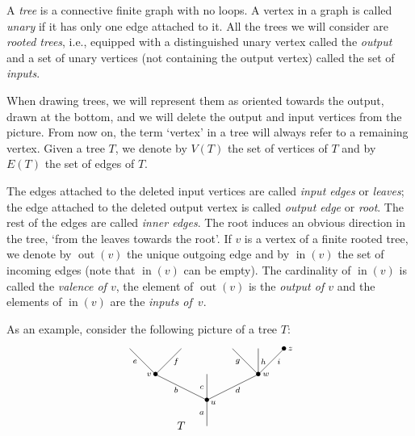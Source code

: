 \documentclass[a4paper]{amsart}
\theoremstyle{plain}
\theoremstyle{definition}
\theoremstyle{remark}
\DeclareMathOperator{\out}{out} \DeclareMathOperator{\inn}{in}
\numberwithin{equation}{section}
\numberwithin{figure}{section}
\begin{document}
A \emph{tree} is a connective finite graph with no loops. A
vertex in a graph is called \emph{unary} if it has only one edge
attached to it. All the trees we will consider are \emph{rooted trees}, i.e., equipped
with a distinguished unary vertex called the \emph{output} and a set of unary vertices (not containing the output vertex)
called the set of \emph{inputs}.

When drawing trees, we will represent them as oriented towards the output, drawn at the bottom, and we will delete the
output and input vertices from the picture. From now on, the term `vertex' in a tree will always refer to a
remaining vertex. Given a tree $T$, we denote by $V(T)$ the set of vertices of $T$ and by $E(T)$ the set of edges of $T$.

The edges attached to the deleted input vertices are called \emph{input edges}
or \emph{leaves}; the edge attached to the deleted output vertex is called \emph{output edge} or \emph{root}. The rest of
the edges are called \emph{inner edges}. The root induces an obvious direction in the tree, `from the leaves towards the
root'. If $v$ is a vertex of a finite rooted tree, we denote by $\out(v)$ the unique
outgoing edge and by $\inn(v)$ the set of incoming edges (note that $\inn(v)$ can be empty).
The cardinality of $\inn(v)$ is called the \emph{valence of $v$}, the element of $\out(v)$ is the
\emph{output of $v$} and the elements of $\inn(v)$ are the \emph{inputs of~$v$}.

As an example, consider the following picture of a tree $T$:

\begin{equation}
    \xy
    <0.08cm, 0cm>:
    (0,-15)*{}="1";
    (0,-5)*=0{\bullet}="2";
    (-20,5)*=0{\bullet}="3";
    (0,5)*=0{}="4";
    (20,5)*=0{\bullet}="5";
    (-30,15)*{}="6";
    (-10,15)*{}="7";
    (10,15)*{}="8";
    (20,15)*{}="9";
    (30,15)*=0{\bullet}="10";
    (2.5,-6)*=0{\scriptstyle u};
    (-22.5,5)*=0{\scriptstyle v};
    (32.5,15)*=0{\scriptstyle z};
    (23,5)*=0{\scriptstyle w};
    (-2,-10)*=0{\scriptstyle a};
    (-2,0)*=0{\scriptstyle c};
    (-28,10)*=0{\scriptstyle e};
    (28,10)*=0{\scriptstyle i};
    (-12,10)*=0{\scriptstyle f};
    (12,-1)*=0{\scriptstyle d};
    (-12,-1)*=0{\scriptstyle b};
    (12,10)*=0{\scriptstyle g};
    (22,10)*=0{\scriptstyle h};
    (-10,-15)*{T};
    "1";"2" **\dir{-};
    "2";"3" **\dir{-};
    "2";"4" **\dir{-};
    "2";"5" **\dir{-};
    "3";"6" **\dir{-};
    "3";"7" **\dir{-};
    "5";"8" **\dir{-};
    "5";"9" **\dir{-};
    "5";"10" **\dir{-};
    \endxy
    \label{treeexample}
\end{equation}
\end{document}
